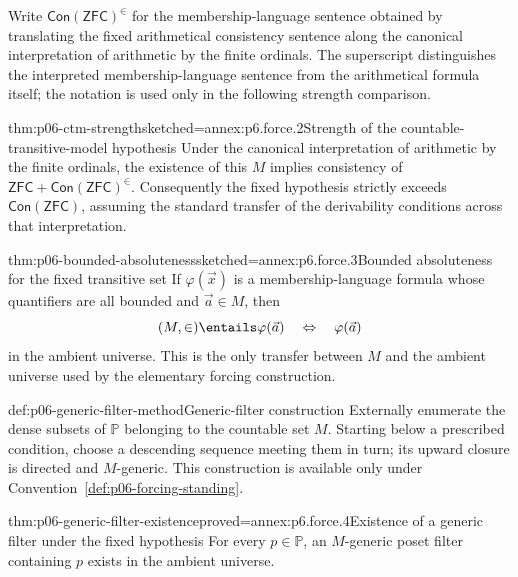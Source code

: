 Write \(\mathsf{Con}(\mathsf{ZFC})^\in\) for the membership-language sentence
obtained by translating the fixed arithmetical consistency sentence along the
canonical interpretation of arithmetic by the finite ordinals.  The
superscript distinguishes the interpreted membership-language sentence from
the arithmetical formula itself; the notation is used only in the following
strength comparison.

\begin{hbtheorem}{thm:p06-ctm-strength}{sketched=annex:p6.force.2}{Strength of the countable-transitive-model hypothesis}
Under the canonical interpretation of arithmetic by the finite ordinals, the
existence of this \(M\) implies consistency of
\(\mathsf{ZFC}+\mathsf{Con}(\mathsf{ZFC})^\in\).  Consequently the fixed
hypothesis strictly exceeds \(\mathsf{Con}(\mathsf{ZFC})\), assuming the
standard transfer of the derivability conditions across that interpretation.
\end{hbtheorem}

\begin{hblemma}{thm:p06-bounded-absoluteness}{sketched=annex:p6.force.3}{Bounded absoluteness for the fixed transitive set}
If \(\varphi(\vec x)\) is a membership-language formula whose quantifiers are
all bounded and \(\vec a\in M\), then
\[
  (M,\in)\entails\varphi(\vec a)
  \quad\Leftrightarrow\quad
  \varphi(\vec a)
\]
in the ambient universe.  This is the only transfer between \(M\) and the
ambient universe used by the elementary forcing construction.
\end{hblemma}

\begin{hbmethod}{def:p06-generic-filter-method}{Generic-filter construction}
Externally enumerate the dense subsets of \(\mathbb P\) belonging to the
countable set \(M\).  Starting below a prescribed condition, choose a
descending sequence meeting them in turn; its upward closure is directed and
\(M\)-generic.  This construction is available only under
Convention~\ref{def:p06-forcing-standing}.
\end{hbmethod}

\begin{hblemma}{thm:p06-generic-filter-existence}{proved=annex:p6.force.4}{Existence of a generic filter under the fixed hypothesis}
For every \(p\in\mathbb P\), an \(M\)-generic poset filter containing \(p\)
exists in the ambient universe.
\end{hblemma}

